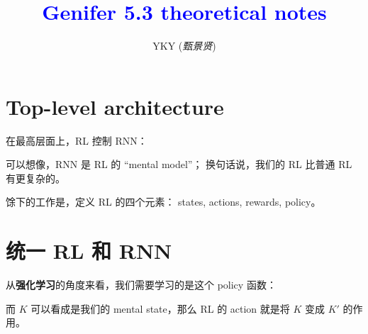 \documentclass[12pt]{article}
\title{\textcolor{blue}{Genifer 5.3 theoretical notes}}
\author{YKY (\textit{甄景贤})}
\newcommand{\tab}{\hspace*{1cm}}
\begin{document}


{\let\newpage\relax\maketitle}

\maketitle
\setlength{\parindent}{0em}
\setlength{\parskip}{2.5ex plus0.5ex minus1.2ex}

\setlength{\abovecaptionskip}{-10ex}
\setlength{\belowcaptionskip}{-15ex}

\section{Top-level architecture}

在最高层面上，RL 控制 RNN：

\begin{center}
\end{center}

可以想像，RNN 是 RL 的 ``mental model''； 换句话说，我们的 RL 比普通 RL 有更复杂的。

馀下的工作是，定义 RL 的四个元素： states, actions, rewards, policy。

\section{统一 RL 和 RNN}

从\textbf{强化学习}的角度来看，我们需要学习的是这个 policy 函数： \par
\begin{figure}[H]
\centering
{}
\end{figure}
而 $K$ 可以看成是我们的 mental state，那么 RL 的 action 就是将 $K$ 变成 $K'$ 的作用。
\end{document}

